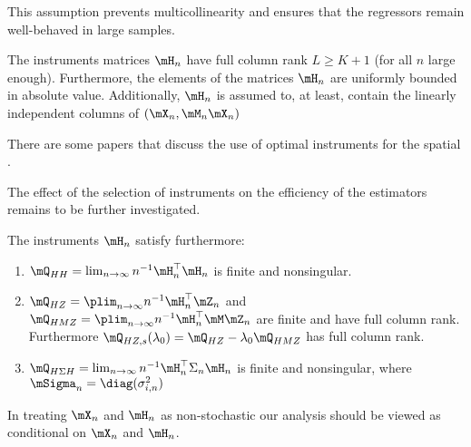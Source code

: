 This assumption prevents multicollinearity and ensures that the regressors remain well-behaved in large samples.

\begin{assumption} The instruments matrices $\mH_n$ have full column rank $L \geq K + 1$ (for all $n$ large enough). Furthermore, the elements of the matrices $\mH_n$ are uniformly bounded in absolute value. Additionally, $\mH_n$ is assumed to, at least, contain the linearly independent columns of $(\mX_n, \mM_n\mX_n)$
\end{assumption}

There are some papers that discuss the use of optimal instruments for the spatial \citep[see for example][]{lee2003best, das2003finite, Keliejian2004, lee2007gmm}.

\begin{remark}
The effect of the selection of instruments on the efficiency of the estimators remains to be further investigated.
\end{remark}

\begin{assumption}\label{assumption:instruments-arraiz} 
The instruments $\mH_n$ satisfy furthermore:
\begin{enumerate}
\item $\mQ_{HH} = \lim_{n \to \infty}n^{-1}\mH_n^\top\mH_n$ is finite and nonsingular.
\item $\mQ_{HZ} = \plim_{n \to \infty}n^{-1}\mH_n^\top\mZ_n$ and $\mQ_{HMZ} = \plim_{n \to \infty}n^{-1}\mH_n^\top\mM\mZ_n$ are finite and have full column rank. Furthermore $\mQ_{HZ,s}(\lambda_0) = \mQ_{HZ}-\lambda_0\mQ_{HMZ}$ has full column rank.
\item $\mQ_{H\Sigma H} = \lim_{n \to \infty}n^{-1}\mH_n^\top\Sigma_n\mH_n$ is finite and nonsingular, where $\mSigma_n= \diag(\sigma^2_{i,n})$
\end{enumerate}
\end{assumption}

In treating $\mX_n$ and $\mH_n$ as non-stochastic our analysis should be viewed as conditional on $\mX_n$ and $\mH_n$.


